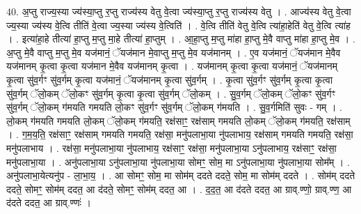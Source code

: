 \documentclass[17pt]{extarticle}
\begin{document}
40. अ॒प्तु राज्य॒स्या ज्य॑स्या॒प्तु र॒प्तु राज्य॑स्य वेतु वे॒त्वा ज्य॑स्या॒प्तु र॒प्तु राज्य॑स्य वेतु । . आज्य॑स्य वेतु वे॒त्वा ज्य॒स्या ज्य॑स्य वे॒त्वि तीति॑ वे॒त्वा ज्य॒स्या ज्य॑स्य वे॒त्विति॑ । . वे॒त्वि तीति॑ वेतु वे॒त्वि त्या॑हा॒हेति॑ वेतु वे॒त्वि त्या॑ह । . इत्या॑हा॒हे तीत्या॑ हा॒प्तु म॒प्तु मा॒हे तीत्या॑ हा॒प्तुम् । . आ॒हा॒प्तु म॒प्तु मा॑हा हा॒प्तु मे॒वै वाप्तु मा॑हा हा॒प्तु मे॒व । . अ॒प्तु मे॒वै वाप्तु म॒प्तु मे॒व यज॑मानं॒ ॅयज॑मान मे॒वाप्तु म॒प्तु मे॒व यज॑मानम् । . ए॒व यज॑मानं॒ ॅयज॑मान मे॒वैव यज॑मानम् कृ॒त्वा कृ॒त्वा यज॑मान मे॒वैव यज॑मानम् कृ॒त्वा । . यज॑मानम् कृ॒त्वा कृ॒त्वा यज॑मानं॒ ॅयज॑मानम् कृ॒त्वा सु॑व॒र्गꣳ सु॑व॒र्गम् कृ॒त्वा यज॑मानं॒ ॅयज॑मानम् कृ॒त्वा सु॑व॒र्गम् । . कृ॒त्वा सु॑व॒र्गꣳ सु॑व॒र्गम् कृ॒त्वा कृ॒त्वा सु॑व॒र्गम् ॅलो॒कम् ॅलो॒कꣳ सु॑व॒र्गम् कृ॒त्वा कृ॒त्वा सु॑व॒र्गम् ॅलो॒कम् । . सु॒व॒र्गम् ॅलो॒कम् ॅलो॒कꣳ सु॑व॒र्गꣳ सु॑व॒र्गम् ॅलो॒कम् ग॑मयति गमयति लो॒कꣳ सु॑व॒र्गꣳ सु॑व॒र्गम् ॅलो॒कम् ग॑मयति । . सु॒व॒र्गमिति॑ सुवः - गम् । . लो॒कम् ग॑मयति गमयति लो॒कम् ॅलो॒कम् ग॑मयति॒ रक्ष॑साꣳ॒॒ रक्ष॑साम् गमयति लो॒कम् ॅलो॒कम् ग॑मयति॒ रक्ष॑साम् । . ग॒म॒य॒ति॒ रक्ष॑साꣳ॒॒ रक्ष॑साम् गमयति गमयति॒ रक्ष॑सा॒ मनु॑पलाभा॒या नु॑पलाभाय॒ रक्ष॑साम् गमयति गमयति॒ रक्ष॑सा॒ मनु॑पलाभाय । . रक्ष॑सा॒ मनु॑पलाभा॒या नु॑पलाभाय॒ रक्ष॑साꣳ॒॒ रक्ष॑सा॒ मनु॑पलाभा॒या ऽनु॑पलाभाय॒ रक्ष॑साꣳ॒॒ रक्ष॑सा॒ मनु॑पलाभा॒या । . अनु॑पलाभा॒या ऽनु॑पलाभा॒या नु॑पलाभा॒या सोमꣳ॒॒ सोम॒ मा ऽनु॑पलाभा॒या नु॑पलाभा॒या सोम᳚म् । . अनु॑पलाभा॒येत्यनु॑प - ला॒भा॒य॒ । . आ सोमꣳ॒॒ सोम॒ मा सोम॑म् ददते ददते॒ सोम॒ मा सोम॑म् ददते । . सोम॑म् ददते ददते॒ सोमꣳ॒॒ सोम॑म् ददत॒ आ द॑दते॒ सोमꣳ॒॒ सोम॑म् ददत॒ आ । . द॒द॒त॒ आ द॑दते ददत॒ आ ग्राव्.ण्णो॒ ग्राव्.ण्ण॒ आ द॑दते ददत॒ आ ग्राव्.ण्णः॑ । \newline
\pagebreak
{}
\end{document}
